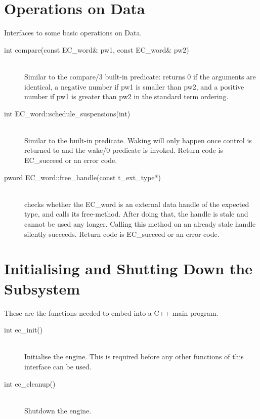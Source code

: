 \section{Operations on {\eclipse} Data}
Interfaces to some basic operations on {\eclipse} Data.
\begin{description}
\item[int		compare(const EC_word\& pw1, const EC_word\& pw2)]\ \\
	Similar to the compare/3 built-in predicate:
	returns 0 if the arguments are identical,
	a negative number if pw1 is smaller than pw2,
	and a positive number if pw1 is greater than pw2
	in the standard term ordering.

\item[int		EC_word::schedule_suspensions(int)]\ \\
	Similar to the
	built-in predicate.
	Waking will only happen once control is returned to {\eclipse}
	and the wake/0 predicate is invoked.
	Return code is EC_succeed or an error code.

\item[pword		EC_word::free_handle(const t_ext_type*)]\ \\
	checks whether the EC_word is an {\eclipse} external data handle of the
	expected type, and calls its free-method. After doing that, the
	handle is stale and cannot be used any longer. Calling this method
	on an already stale handle silently succeeds.
	Return code is EC_succeed or an error code.

\end{description}



\section{Initialising and Shutting Down the {\eclipse} Subsystem}
These are the functions needed to embed {\eclipse} into a C++ main program.
\begin{description}
\item[int		ec_init()]\ \\
	Initialise the {\eclipse} engine. This is required before any other
	functions of this interface can be used.

\item[int		ec_cleanup()]\ \\
	Shutdown the {\eclipse} engine.
\end{description}


